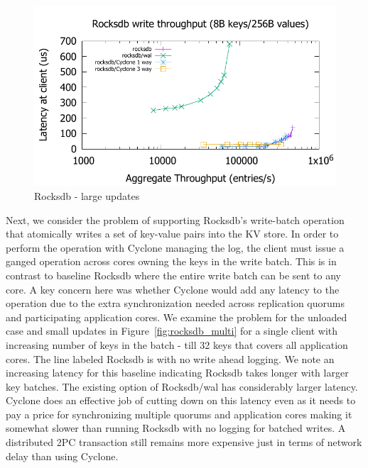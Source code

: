 \documentclass[pageno]{jpaper}
\begin{document}
\begin{figure}
\includegraphics[scale=0.6]{results2/rocksdb_256.pdf}
\caption{Rocksdb - large updates}
\label{fig:rocksdb_256}
\end{figure}

Next, we consider the problem of supporting Rocksdb's write-batch operation that
atomically writes a set of key-value pairs into the KV store. In order to
perform the operation with Cyclone managing the log, the client must issue a
ganged operation across cores owning the keys in the write batch. This is in
contrast to baseline Rocksdb where the entire write batch can be sent to any
core. A key concern here was whether Cyclone would add any latency to the
operation due to the extra synchronization needed across replication quorums and
participating application cores. We examine the problem for the unloaded case
and small updates in Figure~\ref{fig:rocksdb_multi} for a single client with
increasing number of keys in the batch - till 32 keys that covers all
application cores. The line labeled Rocksdb is with no write ahead logging. We
note an increasing latency for this baseline indicating Rocksdb takes longer
with larger key batches. The existing option of Rocksdb/wal has considerably
larger latency. Cyclone does an effective job of cutting down on this latency
even as it needs to pay a price for synchronizing multiple quorums and
application cores making it somewhat slower than running Rocksdb with no logging
for batched writes. A distributed 2PC transaction still remains more expensive
just in terms of network delay than using Cyclone.
\end{document}
